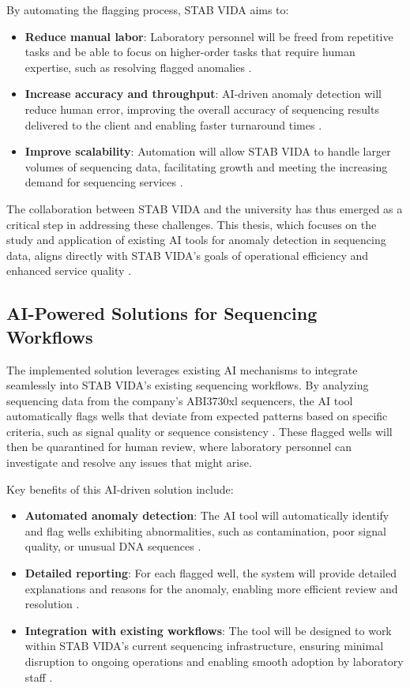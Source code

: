 By automating the flagging process, STAB VIDA aims to:

\begin{itemize} 
  \item \textbf{Reduce manual labor}: Laboratory personnel will be freed from repetitive tasks and be able to focus on higher-order tasks that require human expertise, such as resolving flagged anomalies \cite{Yang2020}. 
  \item \textbf{Increase accuracy and throughput}: AI-driven anomaly detection will reduce human error, improving the overall accuracy of sequencing results delivered to the client and enabling faster turnaround times \cite{Chen2019}. 
  \item \textbf{Improve scalability}: Automation will allow STAB VIDA to handle larger volumes of sequencing data, facilitating growth and meeting the increasing demand for sequencing services \cite{Rajendran2021}.
\end{itemize}

The collaboration between STAB VIDA and the university has thus emerged as a critical step in addressing these challenges. This thesis, which focuses on the study and application of existing AI tools for anomaly detection in sequencing data, aligns directly with STAB VIDA’s goals of operational efficiency and enhanced service quality \cite{Sheng2018}.

\subsection{AI-Powered Solutions for Sequencing Workflows}

The implemented solution leverages existing AI mechanisms to integrate seamlessly into STAB VIDA’s existing sequencing workflows. By analyzing sequencing data from the company's ABI3730xl sequencers, the AI tool automatically flags wells that deviate from expected patterns based on specific criteria, such as signal quality or sequence consistency \cite{Gokcay2019}. These flagged wells will then be quarantined for human review, where laboratory personnel can investigate and resolve any issues that might arise.

Key benefits of this AI-driven solution include:

\begin{itemize} \item \textbf{Automated anomaly detection}: The AI tool will automatically identify and flag wells exhibiting abnormalities, such as contamination, poor signal quality, or unusual DNA sequences \cite{Wu2020}. \item \textbf{Detailed reporting}: For each flagged well, the system will provide detailed explanations and reasons for the anomaly, enabling more efficient review and resolution \cite{Zhang2021}. \item \textbf{Integration with existing workflows}: The tool will be designed to work within STAB VIDA’s current sequencing infrastructure, ensuring minimal disruption to ongoing operations and enabling smooth adoption by laboratory staff \cite{Chen2021}. \end{itemize}

